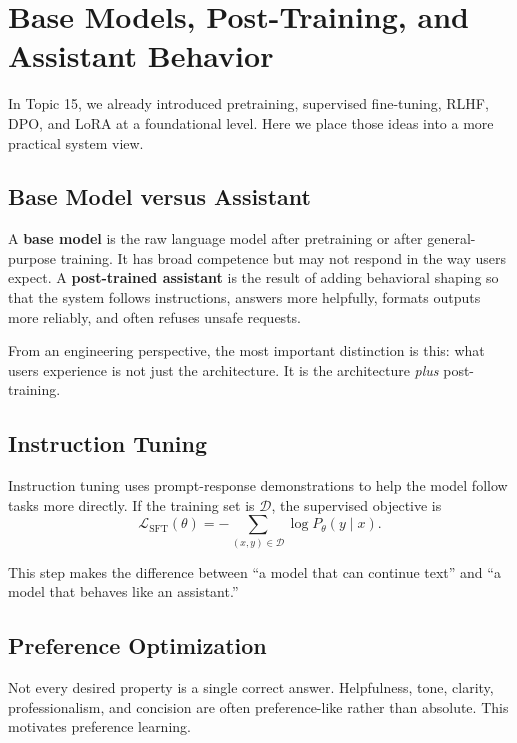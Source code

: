 \documentclass[12pt]{article}
\begin{document}
\section{Base Models, Post-Training, and Assistant Behavior}

In Topic 15, we already introduced pretraining, supervised fine-tuning, RLHF, DPO, and LoRA at a foundational level. Here we place those ideas into a more practical system view.

\subsection{Base Model versus Assistant}

A \textbf{base model} is the raw language model after pretraining or after general-purpose training. It has broad competence but may not respond in the way users expect. A \textbf{post-trained assistant} is the result of adding behavioral shaping so that the system follows instructions, answers more helpfully, formats outputs more reliably, and often refuses unsafe requests.

From an engineering perspective, the most important distinction is this: what users experience is not just the architecture. It is the architecture \emph{plus} post-training.

\subsection{Instruction Tuning}

Instruction tuning uses prompt-response demonstrations to help the model follow tasks more directly. If the training set is $\mathcal{D}$, the supervised objective is
\begin{equation}
    \mathcal{L}_{\mathrm{SFT}}(\theta) = -\sum_{(x,y)\in\mathcal{D}} \log P_\theta(y\mid x).
    \label{t16eq:sft}
\end{equation}

This step makes the difference between ``a model that can continue text'' and ``a model that behaves like an assistant.''

\subsection{Preference Optimization}

Not every desired property is a single correct answer. Helpfulness, tone, clarity, professionalism, and concision are often preference-like rather than absolute. This motivates preference learning.
\end{document}
